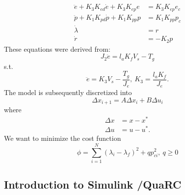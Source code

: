 \begin{subequations}
\label{eq:model_al}
\begin{align}
	\ddot{e} + K_{3} K_{ed} \dot{e} + K_{3} K_{ep} e &= K_{3} K_{ep} e_{c} \label{eq:model_se_al_elev} \\
	\ddot{p} + K_{1} K_{pd} \dot{p} + K_{1} K_{pp} p &= K_{1} K_{pp} p_{c} \label{eq:model_se_al_pitch} \\
	\dot{\lambda} &= r \label{eq:model_se_al_lambda} \\
	\dot{r} &= -K_{2} p \label{eq:model_se_al_r} 
\end{align}
\end{subequations}
These equations were derived from: 
\begin{equation}
	J_{2} \ddot{e} = l_{a} K_{f} V_{s} - T_{g}
	\end{equation}
s.t.
\begin{equation*}
\ddot{e}=K_{3} V_{s}-\frac{T_{g}}{J_{e}},\: K_{3}=\frac{l_{a}K_{f}}{J_{e}}.
\end{equation*}
The model is subsequently discretized into
\begin{equation*}
\Delta x_{i+1}=A\Delta x_{i} + B\Delta u_{i}
\end{equation*} 	
where
\begin{align}
\Delta x &= x -x^* \\
\Delta u &= u -u^*.
\end{align}
We want to minimize the cost function 
\begin{equation}
\phi = \sum_{i=1}^{N}(\lambda_{i}-\lambda_{f})^2+qp_{ci}^{2},\:q\geq 0
\end{equation}
\subsection{Introduction to Simulink /QuaRC}

